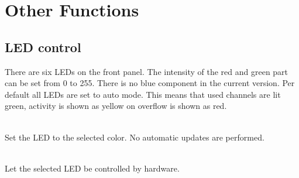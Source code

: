    \section{Other Functions}
        \subsection{LED control}

            There are six LEDs on the front panel. The intensity of the red and green part can be set from 0 to 255. There is no blue component in the current version. Per default all LEDs are set to auto mode. This means that used channels are lit green, activity is shown as yellow on overflow is shown as red.\par

                \\
            Set the LED to the selected color. No automatic updates are performed.\par

             \\
            Let the selected LED be controlled by hardware.